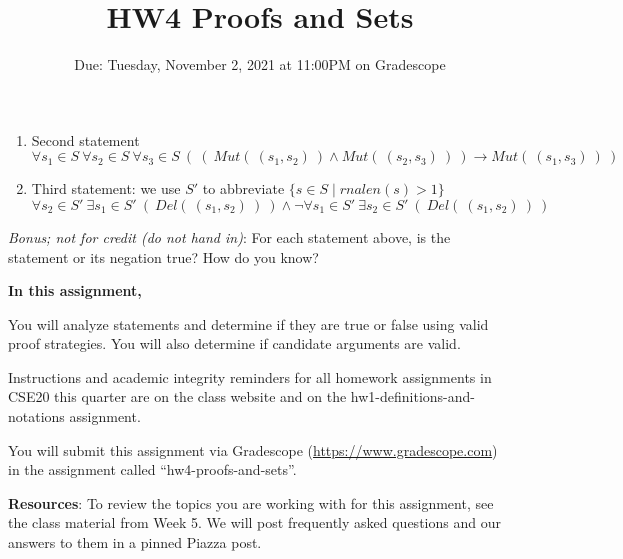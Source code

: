 \documentclass[12pt, oneside]{article}
\begin{document}
\begin{enumerate}
\begin{enumerate}
 \item Second statement
 \[
 \forall s_1 \in S ~ \forall s_2 \in S ~\forall s_3 \in S ~\left( ~\left(~Mut(~(s_1,s_2)~) \land Mut(~(s_2, s_3)~) ~\right) \to Mut(~(s_1,s_3)~)~\right)
 \]
 
 \item Third statement: we use $S'$ to abbreviate $\{ s\in S \mid rnalen(s) > 1\}$
 \[
 \forall s_2 \in S' ~\exists s_1 \in S'~\left(~ Del(~(s_1,s_2)~)~\right) 
 \land \lnot \forall s_1 \in S' ~\exists s_2 \in S'~\left(~ Del(~(s_1,s_2)~)~\right) 
 \]
 \end{enumerate}

 {\it Bonus; not for credit (do not hand in)}:  For each statement above, is the statement or its negation true? How do you know?
 
 
\end{enumerate}
\newpage

\title{HW4 Proofs and Sets}
\date{Due: Tuesday, November 2, 2021 at 11:00PM on Gradescope}


\maketitle
\thispagestyle{fancy}

{\bf In this assignment,}

You will analyze statements and determine if they are true or false using valid proof strategies.
You will also determine if candidate arguments are valid.

Instructions and academic integrity reminders for all homework assignments in 
CSE20 this quarter are on the class website and on the hw1-definitions-and-notations
assignment.

You will submit this assignment via Gradescope
(\href{https://www.gradescope.com}{https://www.gradescope.com}) 
in the assignment called ``hw4-proofs-and-sets''.

{\bf Resources}: To review the topics you are working with 
for this assignment, see the class material from Week 5.
We will post frequently asked questions and our answers to them in a 
pinned Piazza post.
\end{document}
